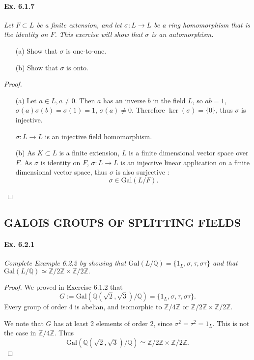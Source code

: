 \documentclass[11pt,a4paper]{article}
\newcommand{\Q}{\mathbb{Q}}
\newcommand{\Z}{\mathbb{Z}}
\newcommand{\Gal}{\mathrm{Gal}}
\begin{document}
\paragraph{Ex. 6.1.7} 
{\it Let $F \subset L$ be a finite extension, and let $\sigma : L \to L$ be a ring homomorphism that is the identity on $F$. This exercise will show that $\sigma$ is an automorphism.
\begin{enumerate}
\item[(a)] Show that $\sigma$ is one-to-one.
\item[(b)] Show that $\sigma$ is onto.
\end{enumerate}
}

\begin{proof}
\begin{enumerate}
\item[(a)]
Let $a \in L, a\neq 0$. Then $a$ has an inverse $b$ in the field $L$, so $ab=1$, $\sigma(a) \sigma(b) = \sigma(1) = 1 $, $\sigma(a) \neq 0$. Therefore $\ker(\sigma) =\{0\}$, thus $\sigma$ is injective.

$\sigma : L \to L$ is an injective field homomorphism.

\item[(b)]
As $K \subset L$ is a finite extension, $L$ is a finite dimensional vector space over $F$. As $\sigma$ is identity on $F$, $\sigma : L \to L$ is an injective linear application on a finite dimensional vector space, thus $\sigma$ is also surjective :   $$\sigma \in \mathrm{Gal}(L/F).$$
\end{enumerate}
\end{proof}

\subsection{GALOIS GROUPS OF SPLITTING FIELDS}
\paragraph{Ex. 6.2.1}

{\it Complete Example 6.2.2 by showing that $\Gal(L/\Q) = \{1_L,\sigma, \tau, \sigma \tau\}$ and that
$\Gal(L/\Q)\simeq \Z/2\Z \times \Z/2\Z.$
}

\begin{proof}
We proved in Exercise 6.1.2 that $$ G:= \mathrm{Gal}(\Q(\sqrt{2},\sqrt{3})/\Q) =\{1_L, \sigma, \tau, \sigma \tau\}.$$
Every group of order 4 is abelian, and isomorphic to $\Z/4\Z$ or $\Z/2\Z \times \Z/2\Z$.

We note that $G$ has at least 2 elements of order 2, since $\sigma^2 = \tau^2 = 1_L$. This is not the case in  $\Z/4\Z$. Thus 
$$\mathrm{Gal}(\Q(\sqrt{2},\sqrt{3})/\Q) \simeq \Z/2\Z \times \Z/2\Z.$$
\end{proof}
\end{document}
